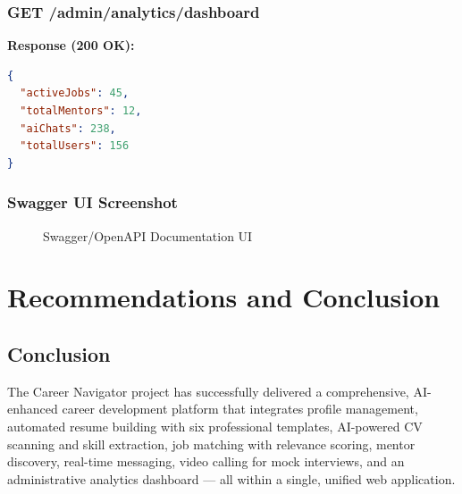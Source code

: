 \documentclass[12pt,a4paper]{report}
\begin{document}
\subsection{GET /admin/analytics/dashboard}

\textbf{Response (200 OK):}
\begin{lstlisting}[language=json]
{
  "activeJobs": 45,
  "totalMentors": 12,
  "aiChats": 238,
  "totalUsers": 156
}
\end{lstlisting}

\subsection{Swagger UI Screenshot}

\begin{figure}[H]
\centering
{}
\caption{Swagger/OpenAPI Documentation UI}
\end{figure}

\chapter{Recommendations and Conclusion}

\section{Conclusion}

The Career Navigator project has successfully delivered a comprehensive, AI-enhanced career development platform that integrates profile management, automated resume building with six professional templates, AI-powered CV scanning and skill extraction, job matching with relevance scoring, mentor discovery, real-time messaging, video calling for mock interviews, and an administrative analytics dashboard — all within a single, unified web application.
\end{document}
